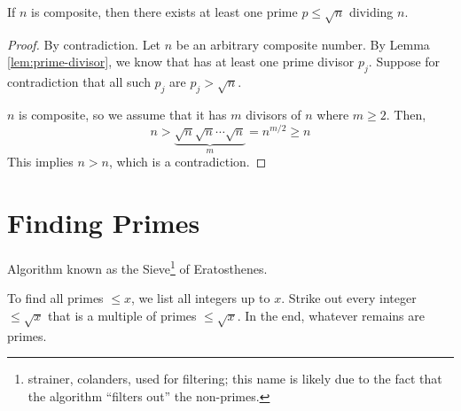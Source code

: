 \begin{proposition}
    If $n$ is composite, then there exists at least one prime $p \leq \sqrt{n}$ dividing $n$.
\end{proposition}

\begin{proof}
    By contradiction. Let $n$ be an arbitrary composite number. By Lemma \ref{lem:prime-divisor}, we know that  has at least one prime divisor $p_j$. Suppose for contradiction that all such $p_j$ are $p_j > \sqrt{n}$.

    $n$ is composite, so we assume that it has $m$ divisors of $n$ where $m \geq 2$. Then,
    $$
    n > \underbrace{\sqrt{n} \sqrt{n} \cdots \sqrt{n}}_{m} = n^{m/2} \geq n
    $$
    This implies $n > n$, which is a contradiction.
\end{proof}

\section{Finding Primes}

Algorithm known as the Sieve\footnote{strainer, colanders, used for filtering; this name is likely due to the fact that the algorithm ``filters out'' the non-primes.} of Eratosthenes.

To find all primes $\leq x$, we list all integers up to $x$. Strike out every integer $\leq \sqrt{x}$ that is a multiple of primes $\leq \sqrt{x}$. In the end, whatever remains are primes.

